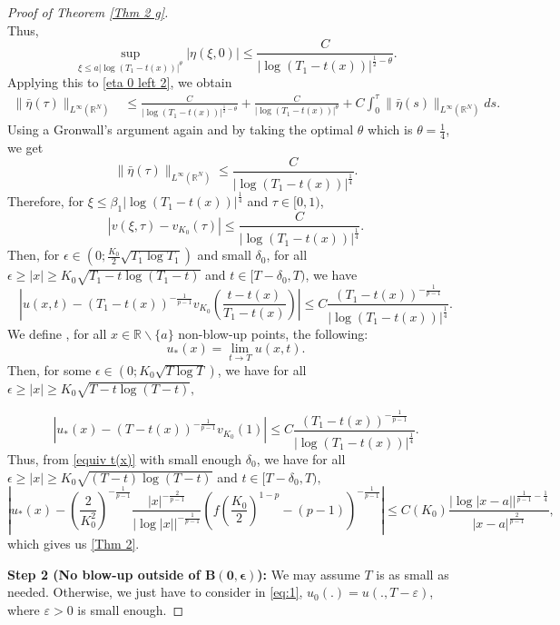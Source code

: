 \documentclass[10pt,a4paper]{amsart}
\newcommand{\R}{\numberset{R}}
\newcommand{\numberset}{\mathbb}
\begin{document}
\begin{proof}[Proof of Theorem \ref{Thm 2 g}]
\begin{equation*}
\end{equation*}
Thus,
\begin{equation}\label{profile v(0)}
\underset{\xi\leq a |\log(T_1-t(x))|^{\theta}}{\sup}|\eta(\xi,0)|\leq \frac{C}{|\log(T_1-t(x))|^{\frac{1}{2}-\theta}}.
\end{equation}
Applying this to \eqref{eta 0 left 2}, we obtain
\begin{equation*}
\begin{split}
\|\bar{\eta}(\tau)\|_{L^\infty(\R^N)}&\leq \frac{C}{|\log(T_1-t(x))|^{\frac{1}{2}-\theta}}+\frac{C}{|\log (T_1-t(x))|^{\theta}}+C\int^\tau_0 \|\bar{\eta}(s)\|_{L^\infty(\R^N)}ds.
\end{split}
\end{equation*}
Using a Gronwall's argument again and by taking the optimal $\theta$ which is $\theta=\frac{1}{4}$, we get 
$$\|\bar{\eta}(\tau)\|_{L^\infty(\R^N)} \leq \frac{C}{|\log(T_1-t(x))|^{\frac{1}{4}}}.$$
Therefore, for $\xi\leq \beta_1|\log(T_1-t(x))|^{\frac{1}{4}}$ and $\tau \in [0,1)$,
$$|v(\xi,\tau)-v_{K_0}(\tau)|\leq \frac{C}{|\log(T_1-t(x))|^{\frac{1}{4}}}.$$
Then, for $\epsilon\in  (0; \frac{K_0}{2} \sqrt{T_1 \log T_1})$ and small $\delta_0$, for all $\epsilon\geq |x|\geq K_0 \sqrt{T_1-t \log (T_1-t)}$ and $t\in [T-\delta_0,T)$, we have
$$\left|u(x,t)-(T_1-t(x))^{-\frac{1}{p-1}}v_{K_0}\left(\frac{t-t(x)}{T_1-t(x)}\right)\right|\leq  C\frac{(T_1-t(x))^{-\frac{1}{p-1}}}{|\log(T_1-t(x))|^{\frac{1}{4}}}.$$
We define , for all $x\in \R\backslash \{a\}$ non-blow-up points, the following:
$$u_*(x)=\underset{t\rightarrow T}{\lim}u(x,t).$$
Then, for some  $\epsilon\in  (0; K_0 \sqrt{T \log T})$, we have for all $\epsilon\geq |x|\geq K_0 \sqrt{T-t \log (T-t)},$

$$|u_*(x)-(T-t(x))^{-\frac{1}{p-1}}v_{K_0}(1)|\leq  C\frac{(T_1-t(x))^{-\frac{1}{p-1}}}{|\log(T_1-t(x))|^{\frac{1}{4}}}.$$
Thus, from \eqref{equiv t(x)} with small enough $\delta_0$, we have for all $\epsilon\geq |x|\geq K_0 \sqrt{(T-t )\log (T-t)}$ and $t\in [T-\delta_0,T),$
\begin{equation}\label{final profile proof}
\left|u_*(x)-\left(\frac{2}{K_0^2}\right)^{-\frac{1}{p-1}}\frac{|x|^{-\frac{2}{p-1}}}{|\log|x||^{-\frac{1}{p-1}}}\left(f\left(\frac{K_0}{2}\right)^{1-p}-(p-1)\right)^{-\frac{1}{p-1}}\right|\leq  C(K_0) \frac {|\log|x-a||^{\frac{1}{p-1} - \frac{1}{4}}} {|x-a|^{\frac{2}{p-1}}},
\end{equation}
which gives us \eqref{Thm 2}. 

\textbf{Step 2 (No blow-up outside of $\mathbf{B(0,\epsilon)}$):} We may assume $T$ is as small as needed. Otherwise, we just have to consider in \eqref{eq:1}, $u_0(.)=u(.,T-\varepsilon)$, where $\varepsilon>0$ is small enough.


\end{proof}
\end{document}
